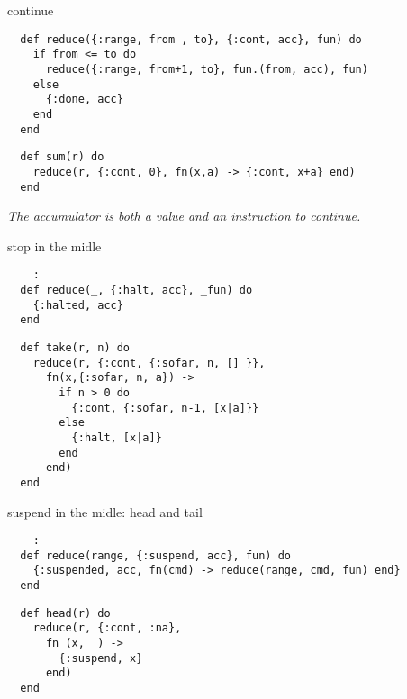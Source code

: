 \begin{frame}[fragile]{continue}

\begin{verbatim}
  def reduce({:range, from , to}, {:cont, acc}, fun) do
    if from <= to do
      reduce({:range, from+1, to}, fun.(from, acc), fun)
    else
      {:done, acc}
    end
  end
\end{verbatim}

  \vspace{20pt}\pause
  
\begin{verbatim}
  def sum(r) do
    reduce(r, {:cont, 0}, fn(x,a) -> {:cont, x+a} end)
  end
\end{verbatim}

  \vspace{10pt}\pause
  {\em The accumulator is both a value and an instruction to continue.}

  
\end{frame}

\begin{frame}[fragile]{stop in the midle}

\begin{verbatim}
    :
  def reduce(_, {:halt, acc}, _fun) do
    {:halted, acc}
  end
\end{verbatim}

\vspace{20pt}\pause
\begin{verbatim}
  def take(r, n) do
    reduce(r, {:cont, {:sofar, n, [] }},
      fn(x,{:sofar, n, a}) ->
        if n > 0 do
          {:cont, {:sofar, n-1, [x|a]}}
        else
          {:halt, [x|a]}
        end
      end)
  end    
\end{verbatim}
  
\end{frame}



\begin{frame}[fragile]{suspend in the midle:  head and tail }

  
\begin{verbatim}
    :
  def reduce(range, {:suspend, acc}, fun) do
    {:suspended, acc, fn(cmd) -> reduce(range, cmd, fun) end}
  end
\end{verbatim}
  \pause


\begin{verbatim}
  def head(r) do
    reduce(r, {:cont, :na},
      fn (x, _) ->
        {:suspend, x}
      end)
  end
\end{verbatim}
  
\end{frame}

